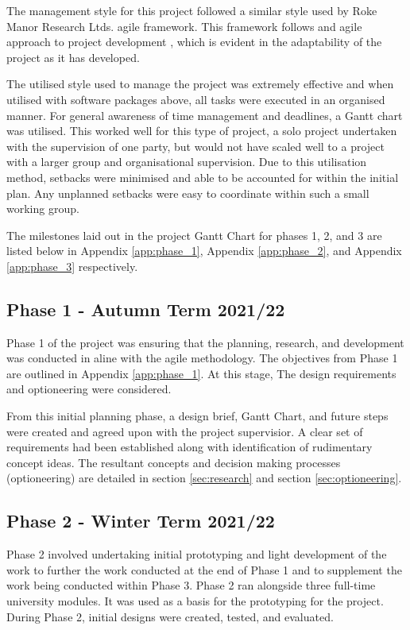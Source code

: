\documentclass [11pt]{article}
\begin{document}
The management style for this project followed a similar style used by Roke Manor Research Ltds. agile framework. This framework follows and agile approach to project development \cite{agile_development}, which is evident in the adaptability of the project as it has developed. 

The utilised style used to manage the project was extremely effective and when utilised with software packages above, all tasks were executed in an organised manner. For general awareness of time management and deadlines, a Gantt chart was utilised. This worked well for this type of project, a solo project undertaken with the supervision of one party, but would not have scaled well to a project with a larger group and organisational supervision. Due to this utilisation method, setbacks were minimised and able to be accounted for within the initial plan. Any unplanned setbacks were easy to coordinate within such a small working group. 

The milestones laid out in the project Gantt Chart for phases 1, 2, and 3 are listed below in Appendix \ref{app:phase_1}, Appendix \ref{app:phase_2}, and Appendix \ref{app:phase_3} respectively.

\subsection{Phase 1 - Autumn Term 2021/22}

Phase 1 of the project was ensuring that the planning, research, and development was conducted in aline with the agile methodology. The objectives from Phase 1 are outlined in Appendix \ref{app:phase_1}. At this stage, The design requirements and optioneering were considered.  

From this initial planning phase, a design brief, Gantt Chart, and future steps were created and agreed upon with the project supervisior. A clear set of requirements had been established along with identification of rudimentary concept ideas. The resultant concepts and decision making processes (optioneering) are detailed in section \ref{sec:research} and section \ref{sec:optioneering}.  

\subsection{Phase 2 - Winter Term 2021/22}

Phase 2 involved undertaking initial prototyping and light development of the work to further the work conducted at the end of Phase 1 and to supplement the work being conducted within Phase 3. Phase 2 ran alongside three full-time university modules. It was used as a basis for the prototyping for the project. During Phase 2, initial designs were created, tested, and evaluated. 
\end{document}
